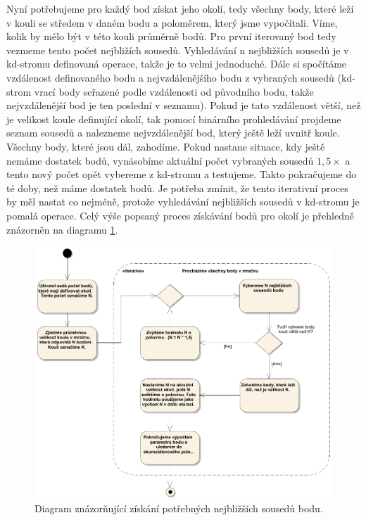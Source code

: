 \documentclass[11pt,twoside,a4paper]{book}
\begin{document}
Nyní potřebujeme pro každý bod získat jeho okolí, tedy všechny body, které leží v kouli se středem v daném bodu a poloměrem, který jsme vypočítali. Víme, kolik by mělo být v této kouli průměrně bodů. Pro první iterovaný bod tedy vezmeme tento počet nejbližích sousedů. Vyhledávání n nejbližších sousedů je v kd-stromu definovaná operace, takže je to velmi jednoduché. Dále si spočítáme vzdálenost definovaného bodu a nejvzdálenějšího bodu z vybraných sousedů (kd-strom vrací body seřazené podle vzdálenosti od původního bodu, takže nejvzdálenější bod je ten poslední v seznamu). Pokud je tato vzdálenost větší, než je velikost koule definující okolí, tak pomocí binárního prohledávání projdeme seznam sousedů a nalezneme nejvzdálenější bod, který ještě leží uvnitř koule. Všechny body, které jsou dál, zahodíme. Pokud nastane situace, kdy ještě nemáme dostatek bodů, vynásobíme aktuální počet vybraných sousedů $1,5 \times$ a tento nový počet opět vybereme z kd-stromu a testujeme. Takto pokračujeme do té doby, než máme dostatek bodů. Je potřeba zmínit, že tento iterativní proces by měl nastat co nejméně, protože vyhledávání nejbližších sousedů v kd-stromu je pomalá operace. Celý výše popsaný proces získávání bodů pro okolí je přehledně znázorněn na diagramu \ref{fig:diag-okoli}.

\begin{figure}[ht]
\begin{center}
\includegraphics[width=\textwidth]{figures/okoli-diagram-algoritmus}
\caption{Diagram znázorňující získání potřebných nejbližších sousedů bodu.}
\label{fig:diag-okoli}
\end{center}
\end{figure}
\end{document}
